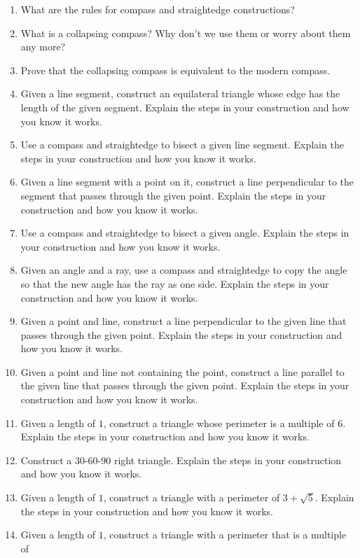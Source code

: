 \begin{problems}
\begin{enumerate}
\item What are the rules for compass and straightedge constructions?
\item What is a collapsing compass? Why don't we use them or worry about them any more?
\item Prove that the collapsing compass is equivalent to the modern compass.
\item Given a line segment, construct an equilateral triangle whose edge has the length of the given segment. Explain the steps in your construction and how you know it works.
\item Use a compass and straightedge to bisect a given line segment. Explain the steps in your construction and how you know it works.
\item Given a line segment with a point on it, construct a line perpendicular to the segment that passes through the given point. Explain the steps in your construction and how you know it works.
\item Use a compass and straightedge to bisect a given angle. Explain the steps in your construction and how you know it works.
\item Given an angle and a ray, use a compass and straightedge to copy the angle so that the new angle has the ray as one side. Explain the steps in your construction and how you know it works.
\item Given a point and line, construct a line perpendicular to the given line that passes through the given point. Explain the steps in your construction and how you know it works.
\item Given a point and line not containing the point, construct a line parallel to the given line that passes through the given point. Explain the steps in your construction and how you know it works.
\item Given a length of $1$, construct a triangle whose perimeter is a
  multiple of $6$. Explain the steps in your construction and how you know it works.
\item Construct a $30$-$60$-$90$ right triangle. Explain the steps in your
  construction and how you know it works.
\item Given a length of $1$, construct a triangle with a perimeter of
  $3 + \sqrt{5}$. Explain the steps in your construction and how you know it works.
\item Given a length of $1$, construct a triangle with a perimeter that is a multiple of

\end{enumerate}
\end{problems}
